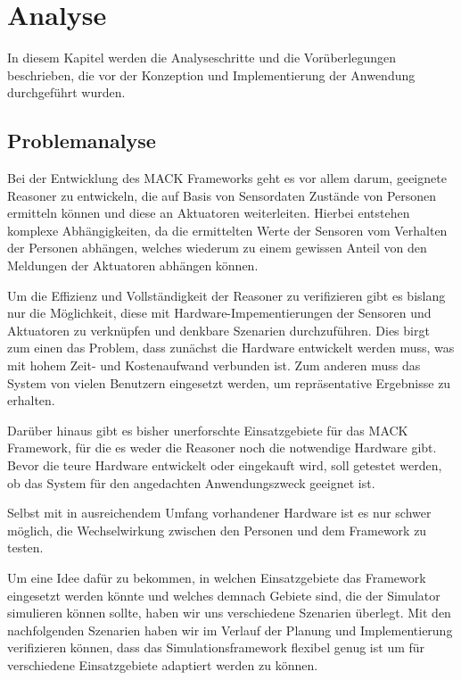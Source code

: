 \chapter{Analyse}\label{chapter:analysis}
In diesem Kapitel werden die Analyseschritte und die Vorüberlegungen beschrieben, die vor der Konzeption und Implementierung der Anwendung durchgeführt wurden.


\section{Problemanalyse}\label{sec:problem_ana}
Bei der Entwicklung des MACK Frameworks geht es vor allem darum, geeignete Reasoner zu entwickeln, die auf Basis von Sensordaten Zustände von Personen ermitteln können und diese an Aktuatoren weiterleiten. Hierbei entstehen komplexe Abhängigkeiten, da die ermittelten Werte der Sensoren vom Verhalten der Personen abhängen, welches wiederum zu einem gewissen Anteil von den Meldungen der Aktuatoren abhängen können.

Um die Effizienz und Vollständigkeit der Reasoner zu verifizieren gibt es bislang nur die Möglichkeit, diese mit Hardware-Impementierungen der Sensoren und Aktuatoren zu verknüpfen und denkbare Szenarien durchzuführen. Dies birgt zum einen das Problem, dass zunächst die Hardware entwickelt werden muss, was mit hohem Zeit- und Kostenaufwand verbunden ist. Zum anderen muss das System von vielen Benutzern eingesetzt werden, um repräsentative Ergebnisse zu erhalten.

Darüber hinaus gibt es bisher unerforschte Einsatzgebiete für das MACK Framework, für die es weder die Reasoner noch die notwendige Hardware gibt. Bevor die teure Hardware entwickelt oder eingekauft wird, soll getestet werden, ob das System für den angedachten Anwendungszweck geeignet ist.

Selbst mit in ausreichendem Umfang vorhandener Hardware ist es nur schwer möglich, die Wechselwirkung zwischen den Personen und dem Framework zu testen.

Um eine Idee dafür zu bekommen, in welchen Einsatzgebiete das Framework eingesetzt werden könnte und welches demnach Gebiete sind, die der Simulator simulieren können sollte, haben wir uns verschiedene Szenarien überlegt. Mit den nachfolgenden Szenarien haben wir im Verlauf der Planung und Implementierung verifizieren können, dass das Simulationsframework flexibel genug ist um für verschiedene Einsatzgebiete adaptiert werden zu können.

